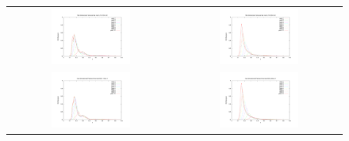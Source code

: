 \begin{figure}[h!]
\begin{tabular}{cc}
\includegraphics[width=0.5\textwidth]{variance_ad_free_mesh_t3_v10.pdf} & \includegraphics[width=0.5\textwidth]{variance_ad_free_mesh_t3_v20.pdf}\\
\includegraphics[width=0.5\textwidth]{variance_ad_free_mesh_t4_v10.pdf} & \includegraphics[width=0.5\textwidth]{variance_ad_free_mesh_t4_v20.pdf}\\
\end{tabular}
\end{figure} \begin{figure}[h!]
\begin{tabular}{cc}

\end{tabular}
\end{figure}
